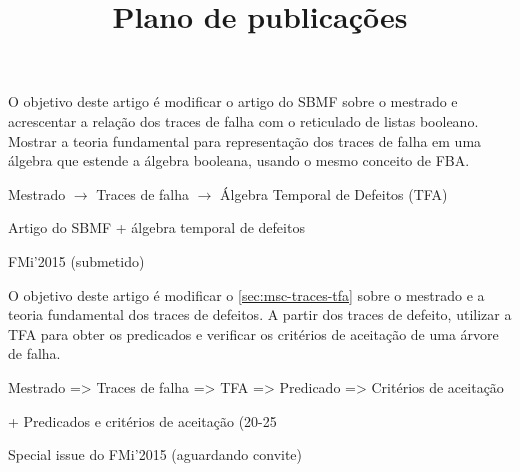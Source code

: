 \documentclass[a5paper,portuges]{article}
\title{Plano de publicações}
\begin{document}
\maketitle

\begin{artigo}
\label{sec:msc-traces-tfa}
\begin{objetivo}
O objetivo deste artigo é modificar o artigo do SBMF sobre o mestrado e acrescentar a relação dos traces de falha com o reticulado de listas booleano. Mostrar a teoria fundamental para representação dos traces de falha em uma álgebra que estende a álgebra booleana, usando o mesmo conceito de FBA.
\end{objetivo}
\begin{fluxo}
Mestrado $\rightarrow$ Traces de falha $\rightarrow$ Álgebra Temporal de Defeitos (TFA)
\end{fluxo}

\begin{paraconseguir}
Artigo do SBMF + álgebra temporal de defeitos
\end{paraconseguir}

\begin{submissao}
  \item FMi'2015 (submetido)
\end{submissao}

\end{artigo}

\begin{artigo}
\label{sec:criterios-aceitacao}
\begin{objetivo}
O objetivo deste artigo é modificar o \cref{sec:msc-traces-tfa} sobre o mestrado e a teoria fundamental dos traces de defeitos. A partir dos traces de defeito, utilizar a TFA para obter os predicados e verificar os critérios de aceitação de uma árvore de falha.
\end{objetivo}
\begin{fluxo}
Mestrado => Traces de falha => TFA => Predicado => Critérios de aceitação
\end{fluxo}
\begin{paraconseguir}
 + Predicados e critérios de aceitação (20-25%
\end{paraconseguir}
\begin{submissao}
  \item Special issue do FMi'2015 (aguardando convite)
\end{submissao}
\end{artigo}
\end{document}
